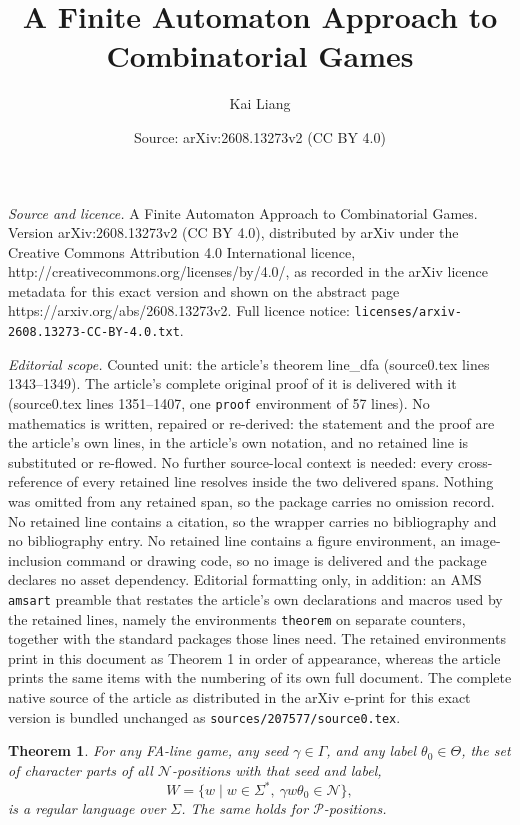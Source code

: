 \documentclass[10pt,a4paper]{amsart}
\title{A Finite Automaton Approach to Combinatorial Games}
\author{Kai Liang}
\date{Source: arXiv:2608.13273v2 (CC BY 4.0)}
\newtheorem{theorem}{Theorem}
\newcommand{\varN}{\mathcal{N}}
\newcommand{\varP}{\mathcal{P}}
\begin{document}
\maketitle

\noindent\emph{Source and licence.} A Finite Automaton Approach to Combinatorial Games. Version arXiv:2608.13273v2 (CC BY 4.0), distributed by arXiv under the Creative Commons Attribution 4.0 International licence, http://creativecommons.org/licenses/by/4.0/, as recorded in the arXiv licence metadata for this exact version and shown on the abstract page https://arxiv.org/abs/2608.13273v2. Full licence notice: \texttt{licenses/arxiv-2608.13273-CC-BY-4.0.txt}.\par\smallskip

\noindent\textit{Editorial scope.} Counted unit: the article's theorem line\_dfa (source0.tex lines 1343--1349). The article's complete original proof of it is delivered with it (source0.tex lines 1351--1407, one \texttt{proof} environment of 57 lines). No mathematics is written, repaired or re-derived: the statement and the proof are the article's own lines, in the article's own notation, and no retained line is substituted or re-flowed.  No further source-local context is needed: every cross-reference of every retained line resolves inside the two delivered spans.  Nothing was omitted from any retained span, so the package carries no omission record.  No retained line contains a citation, so the wrapper carries no bibliography and no bibliography entry.  No retained line contains a figure environment, an image-inclusion command or drawing code, so no image is delivered and the package declares no asset dependency.  Editorial formatting only, in addition: an AMS \texttt{amsart} preamble that restates the article's own declarations and macros used by the retained lines, namely the environments \texttt{theorem} on separate counters, together with the standard packages those lines need.  The retained environments print in this document as Theorem 1 in order of appearance, whereas the article prints the same items with the numbering of its own full document.  The complete native source of the article as distributed in the arXiv e-print for this exact version is bundled unchanged as \texttt{sources/207577/source0.tex}.
\begin{theorem}\label{line_dfa}
    For any FA-line game, any seed $\gamma\in\varGamma$, and any label $\theta_0 \in\varTheta$, the set of character parts of all $\varN$-positions with that seed and label,
    \[
        W = \{w \mid w\in\varSigma^*,\ \gamma w\theta_0 \in \varN\},
    \]
    is a regular language over $\varSigma$. The same holds for $\varP$-positions.
\end{theorem}
\end{document}
